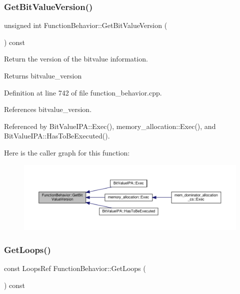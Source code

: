 \subsubsection{\texorpdfstring{Get\+Bit\+Value\+Version()}{GetBitValueVersion()}}
{\footnotesize\ttfamily unsigned int Function\+Behavior\+::\+Get\+Bit\+Value\+Version (\begin{DoxyParamCaption}{ }\end{DoxyParamCaption}) const}



Return the version of the bitvalue information. 

\begin{DoxyReturn}{Returns}
bitvalue\+\_\+version 
\end{DoxyReturn}


Definition at line 742 of file function\+\_\+behavior.\+cpp.



References bitvalue\+\_\+version.



Referenced by Bit\+Value\+I\+P\+A\+::\+Exec(), memory\+\_\+allocation\+::\+Exec(), and Bit\+Value\+I\+P\+A\+::\+Has\+To\+Be\+Executed().

Here is the caller graph for this function\+:
\nopagebreak
\begin{figure}[H]
\begin{center}
\leavevmode
\includegraphics[width=350pt]{d9/d45/classFunctionBehavior_abe80dcf891e6c460895fcf7f91c46fd9_icgraph}
\end{center}
\end{figure}
\mbox{\label{classFunctionBehavior_a88594c29cc7a563b440b08978e91bafc}} 
\subsubsection{\texorpdfstring{Get\+Loops()}{GetLoops()}}
{\footnotesize\ttfamily const Loops\+Ref Function\+Behavior\+::\+Get\+Loops (\begin{DoxyParamCaption}{ }\end{DoxyParamCaption}) const}



